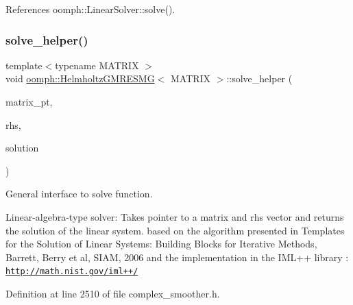 References oomph\+::\+Linear\+Solver\+::solve().

\mbox{\label{classoomph_1_1HelmholtzGMRESMG_a3147aa77b5e71a0822cc5c661dd07e0d}} 
\subsubsection{\texorpdfstring{solve\+\_\+helper()}{solve\_helper()}}
{\footnotesize\ttfamily template$<$typename M\+A\+T\+R\+IX $>$ \\
void \hyperlink{classoomph_1_1HelmholtzGMRESMG}{oomph\+::\+Helmholtz\+G\+M\+R\+E\+S\+MG}$<$ M\+A\+T\+R\+IX $>$\+::solve\+\_\+helper (\begin{DoxyParamCaption}\item[{\hyperlink{classoomph_1_1DoubleMatrixBase}{Double\+Matrix\+Base} $\ast$const \&}]{matrix\+\_\+pt,  }\item[{const \hyperlink{classoomph_1_1DoubleVector}{Double\+Vector} \&}]{rhs,  }\item[{\hyperlink{classoomph_1_1DoubleVector}{Double\+Vector} \&}]{solution }\end{DoxyParamCaption})\hspace{0.3cm}{\ttfamily [protected]}}



General interface to solve function. 

Linear-\/algebra-\/type solver\+: Takes pointer to a matrix and rhs vector and returns the solution of the linear system. based on the algorithm presented in Templates for the Solution of Linear Systems\+: Building Blocks for Iterative Methods, Barrett, Berry et al, S\+I\+AM, 2006 and the implementation in the I\+M\+L++ library \+: \href{http://math.nist.gov/iml++/}{\tt http\+://math.\+nist.\+gov/iml++/} 

Definition at line 2510 of file complex\+\_\+smoother.\+h.



